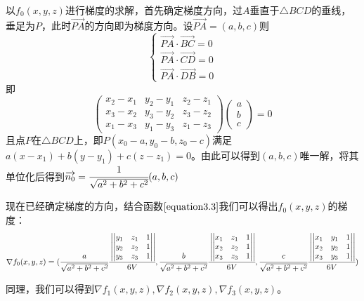 \documentclass[12pt,a4paper]{article}
\begin{document}
以$f_0(x,y,z)$进行梯度的求解，首先确定梯度方向，过$A$垂直于$\triangle BCD$的垂线，垂足为$P$，此时$\overrightarrow {P A}$的方向即为梯度方向。设$\overrightarrow {P A}=(a,b,c)$则$$\begin{cases}\overrightarrow {P A} \cdot \overrightarrow {B C}=0\\ \overrightarrow {P A} \cdot \overrightarrow {C D}=0\\ \overrightarrow {P A} \cdot \overrightarrow {D B}=0
\end{cases}$$
即\begin{equation}
\begin{pmatrix}
x_2-x_1&y_2-y_1&z_2-z_1\\
x_3-x_2&y_3-y_2&z_3-z_2\\
x_1-x_3&y_1-y_3&z_1-z_3
\end{pmatrix}
\begin{pmatrix}
a\\b\\c
\end{pmatrix}=0
\end{equation}
且点$P$在$\triangle BCD$上，即$P(x_0-a,y_0-b,z_0-c)$满足$a(x-x_1)+b(y-y_1)+c(z-z_1)=0$。由此可以得到$(a,b,c)$唯一解，将其单位化后得到$\overrightarrow {n_0}=\cfrac {1}{\sqrt {a^2+b^2+c^2}}(a,b,c)$

现在已经确定梯度的方向，结合函数$\ref{equation3.3}$我们可以得出$f_0(x,y,z)$的梯度：$$\nabla f_0(x,y,z)=(\cfrac {a}{\sqrt {a^2+b^2+c^2}} \cfrac{\left|\begin{vmatrix}
	y_1&z_1&1\\y_2&z_2&1\\y_3&z_3&1
	\end{vmatrix}\right|}{6V},
\cfrac {b}{\sqrt {a^2+b^2+c^2}} \cfrac{\left|\begin{vmatrix}
	x_1&z_1&1\\x_2&z_2&1\\x_3&z_3&1
	\end{vmatrix}\right|}{6V},\cfrac {c}{\sqrt {a^2+b^2+c^2}} \cfrac{\left|\begin{vmatrix}
	x_1&y_1&1\\x_2&y_2&1\\x_3&y_3&1
	\end{vmatrix}\right|}{6V})$$

同理，我们可以得到$\nabla f_1(x,y,z),\nabla f_2(x,y,z),\nabla f_3(x,y,z)$。
\end{document}
